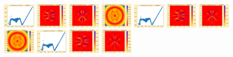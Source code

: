 \documentclass[11pt]{article}
\begin{document}
\includegraphics[width=0.11875\textwidth]{frame0013fig1.png}
\includegraphics[width=0.11875\textwidth]{frame0013fig2.png}
\includegraphics[width=0.11875\textwidth]{frame0013fig3.png}
\vskip 10pt 
\includegraphics[width=0.11875\textwidth]{frame0014fig0.png}
\includegraphics[width=0.11875\textwidth]{frame0014fig1.png}
\includegraphics[width=0.11875\textwidth]{frame0014fig2.png}
\includegraphics[width=0.11875\textwidth]{frame0014fig3.png}
\includegraphics[width=0.11875\textwidth]{frame0015fig0.png}
\includegraphics[width=0.11875\textwidth]{frame0015fig1.png}
\includegraphics[width=0.11875\textwidth]{frame0015fig2.png}
\includegraphics[width=0.11875\textwidth]{frame0015fig3.png}
\end{document}
